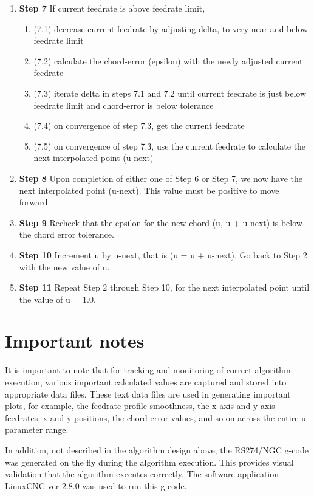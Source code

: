 \begin{enumerate}
    \item \textbf{Step 7} If current feedrate is above feedrate limit,
    \begin{enumerate}
	\item  (7.1) decrease current feedrate by adjusting delta, to very near and below feedrate limit
	\item  (7.2) calculate the chord-error (epsilon) with the newly adjusted current feedrate
	\item  (7.3) iterate delta in steps 7.1 and 7.2 until current feedrate is just below feedrate limit and chord-error is below tolerance
	\item  (7.4) on convergence of step 7.3, get the current feedrate 
	\item  (7.5) on convergence of step 7.3, use the current feedrate to calculate the next interpolated point (u-next)    
    \end{enumerate}
	
	\item \textbf{Step 8} Upon completion of either one of Step 6 or Step 7, we now have the next interpolated point (u-next). This value must be positive to move forward.
	\item \textbf{Step 9} Recheck that the epsilon for the new chord (u, u + u-next) is below the chord error tolerance. 
	\item \textbf{Step 10} Increment u by u-next, that is (u = u + u-next). Go back to Step 2 with the new value of u.
	
	\item \textbf{Step 11} Repeat Step 2 through Step 10, for the next interpolated point until the value of u = 1.0. 

\end{enumerate}

\section{Important notes}

It is important to note that for tracking and monitoring of correct algorithm execution, various important calculated values are captured and stored into appropriate data files. These text data files are used in generating important plots, for example, the feedrate profile  
 smoothness, the x-axis and y-axis feedrates, x and y positions, the chord-error values, and so on across the entire u parameter range. 
\vspace*{1\baselineskip}

In addition, not described in the algorithm design above, the RS274/NGC g-code was generated on the fly during the algorithm execution. This provides visual validation that the algorithm executes correctly. The software application LinuxCNC ver 2.8.0 was used to run this g-code.
\vspace*{1\baselineskip}

